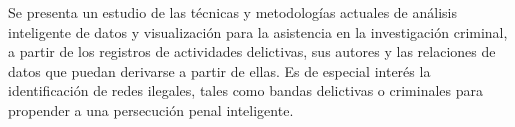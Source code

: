 
Se presenta un estudio de las técnicas y metodologías actuales de análisis inteligente de datos y visualización para la asistencia en la investigación criminal, a partir de los registros de actividades delictivas, sus autores y las relaciones de datos que puedan derivarse a partir de ellas. Es de especial interés la identificación de redes ilegales, tales como bandas delictivas o criminales para propender a una persecución penal inteligente.



